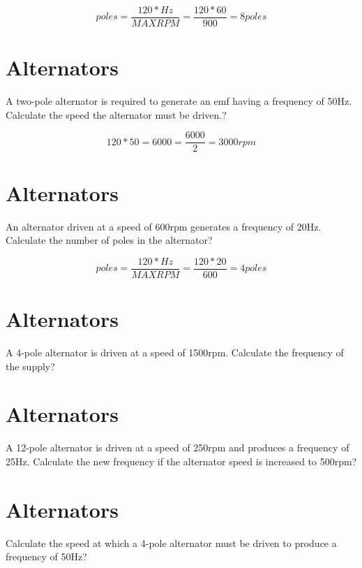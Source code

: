 \documentclass{article}
\begin{document}
      \begin{equation} %
     poles =  \frac{120 * Hz}{MAX RPM} =
     \frac{120 * 60}{900} = 8 poles
    \end{equation} 

    \section{Alternators} %
A two-pole alternator is required to generate an emf having a frequency of 50Hz. Calculate the speed the alternator must be driven.? 
 
      \begin{equation} %
     120 * 50 = 6000 =
     \frac{6000}{2} = 3000rpm
    \end{equation} 

     \section{Alternators} %
An alternator driven at a speed of 600rpm generates a frequency of 20Hz. Calculate the number of poles in the alternator? 
 
    
    \begin{equation} %
     poles =  \frac{120 * Hz}{MAX RPM} =
     \frac{120 * 20}{600} = 4 poles
    \end{equation}      
     
    \section{Alternators} %
A 4-pole alternator is driven at a speed of 1500rpm. Calculate the frequency of the supply? 
 
 
    \section{Alternators} %
A 12-pole alternator is driven at a speed of 250rpm and produces a frequency of 25Hz. Calculate the new frequency if the alternator speed is increased to 500rpm? 
 
 
    \section{Alternators} %
Calculate the speed at which a 4-pole alternator must be driven to produce a frequency of 50Hz? 
 
\end{document}
